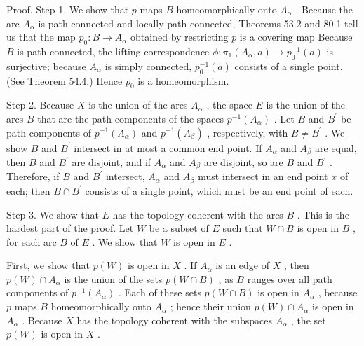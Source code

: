 \documentclass[10pt]{article}
\begin{document}
Proof. Step 1. We show that \(p\) maps \(B\) homeomorphically onto \({A}_{\alpha }\) . Because the arc \({A}_{\alpha }\) is path connected and locally path connected, Theorems 53.2 and 80.1 tell us that the map \({p}_{0} : B \rightarrow  {A}_{\alpha }\) obtained by restricting \(p\) is a covering map Because \(B\) is path connected, the lifting correspondence \(\phi  : {\pi }_{1}\left( {{A}_{\alpha },a}\right)  \rightarrow  {p}_{0}^{-1}\left( a\right)\) is surjective; because \({A}_{\alpha }\) is simply connected, \({p}_{0}^{-1}\left( a\right)\) consists of a single point. (See Theorem 54.4.) Hence \({p}_{0}\) is a homeomorphism.

Step 2. Because \(X\) is the union of the arcs \({A}_{\alpha }\) , the space \(E\) is the union of the arcs \(B\) that are the path components of the spaces \({p}^{-1}\left( {A}_{\alpha }\right)\) . Let \(B\) and \({B}^{\prime }\) be path components of \({p}^{-1}\left( {A}_{\alpha }\right)\) and \({p}^{-1}\left( {A}_{\beta }\right)\) , respectively, with \(B \neq  {B}^{\prime }\) . We show \(B\) and \({B}^{\prime }\) intersect in at most a common end point. If \({A}_{\alpha }\) and \({A}_{\beta }\) are equal, then \(B\) and \({B}^{\prime }\) are disjoint, and if \({A}_{\alpha }\) and \({A}_{\beta }\) are disjoint, so are \(B\) and \({B}^{\prime }\) . Therefore, if \(B\) and \({B}^{\prime }\) intersect, \({A}_{\alpha }\) and \({A}_{\beta }\) must intersect in an end point \(x\) of each; then \(B \cap  {B}^{\prime }\) consists of a single point, which must be an end point of each.

Step 3. We show that \(E\) has the topology coherent with the arcs \(B\) . This is the hardest part of the proof. Let \(W\) be a subset of \(E\) such that \(W \cap  B\) is open in \(B\) , for each arc \(B\) of \(E\) . We show that \(W\) is open in \(E\) .

First, we show that \(p\left( W\right)\) is open in \(X\) . If \({A}_{\alpha }\) is an edge of \(X\) , then \(p\left( W\right)  \cap  {A}_{\alpha }\) is the union of the sets \(p\left( {W \cap  B}\right)\) , as \(B\) ranges over all path components of \({p}^{-1}\left( {A}_{\alpha }\right)\) . Each of these sets \(p\left( {W \cap  B}\right)\) is open in \({A}_{\alpha }\) , because \(p\) maps \(B\) homeomorphically onto \({A}_{\alpha }\) ; hence their union \(p\left( W\right)  \cap  {A}_{\alpha }\) is open in \({A}_{\alpha }\) . Because \(X\) has the topology coherent with the subspaces \({A}_{\alpha }\) , the set \(p\left( W\right)\) is open in \(X\) .
\end{document}

